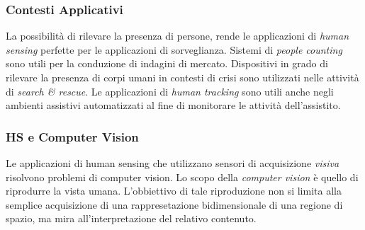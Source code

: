             \subsubsection{Contesti Applicativi}
                La possibilità di rilevare la presenza di persone, rende le applicazioni di \emph{human sensing} perfette per le applicazioni di sorveglianza.
                Sistemi di \emph{people counting} sono utili per la conduzione di indagini di mercato.
                Dispositivi in grado di rilevare la presenza di corpi umani in contesti di crisi sono utilizzati nelle attività di \emph{search & rescue}.
                Le applicazioni di \emph{human tracking} sono utili anche negli ambienti assistivi automatizzati al fine di monitorare le attività dell'assistito.
            \subsubsection{HS e Computer Vision}
                Le applicazioni di human sensing che utilizzano sensori di acquisizione \emph{visiva} risolvono problemi di computer vision.
                Lo scopo della \emph{computer vision} è quello di riprodurre la vista umana. L'obbiettivo di tale riproduzione non si limita alla semplice acquisizione di una rappresetazione bidimensionale di una regione di spazio, ma mira all'interpretazione del relativo contenuto.
